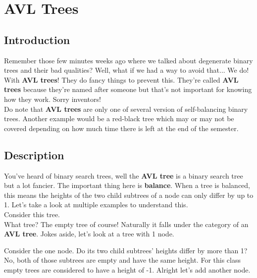 \documentclass[11pt]{book}
\begin{document}
	\setcounter{chapter}{4}
	\chapter{AVL Trees}
	\section{Introduction}
		Remember those few minutes weeks ago where we talked about degenerate
		binary trees and their bad qualities? Well, what if we had a way to avoid
		that... We do! With \textbf{AVL trees}! They do fancy things to prevent this.
		They're called \textbf{AVL trees} because they're named after someone but that's
		not important for knowing how they work. Sorry inventors! \\

		\noindent Do note that \textbf{AVL trees} are only one of several version of
		self-balancing binary trees. Another example would be a red-black tree
		which may or may not be covered depending on how much time there is left
		at the end of the semester.

	\section{Description}
		You've heard of binary search trees, well the \textbf{AVL tree} is a binary
		search tree but a lot fancier. The important thing here is \textbf{balance}.
		When a tree is balanced, this means the heights of the two child subtrees of
		a node can only differ by up to 1. Let's take a look at multiple examples to
		understand this. \\

		\noindent Consider this tree. \\

		\noindent What tree? The empty tree of course! Naturally it falls under the
		category of an \textbf{AVL tree}. Jokes aside, let's look at a tree with 1 node.

		\begin{center}
		\end{center}

		\noindent Consider the one node. Do its two child subtrees' heights differ by more
		than 1? No, both of those subtrees are empty and have the same height. For this class
		empty trees are considered to have a height of -1. Alright let's add another node.
\end{document}
